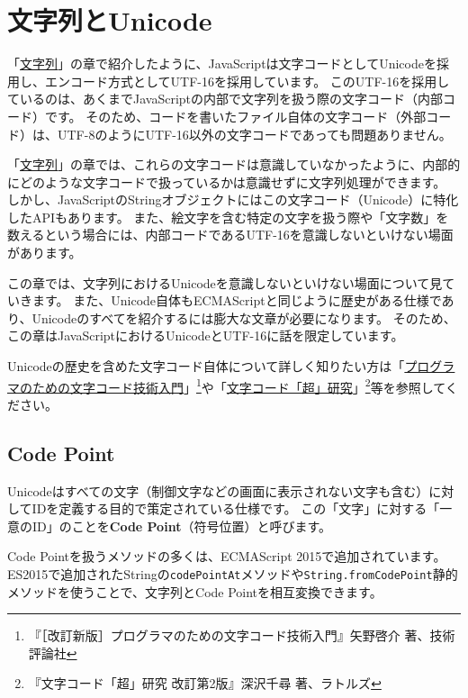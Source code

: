\hypertarget{string-unicode}{%
\chapter{文字列とUnicode}\label{string-unicode}}
\thispagestyle{frontheadings}

「\hyperlink{string}{文字列}」の章で紹介したように、JavaScriptは文字コードとしてUnicodeを採用し、エンコード方式としてUTF-16を採用しています。
このUTF-16を採用しているのは、あくまでJavaScriptの内部で文字列を扱う際の文字コード（内部コード）です。
そのため、コードを書いたファイル自体の文字コード（外部コード）は、UTF-8のようにUTF-16以外の文字コードであっても問題ありません。

「\hyperlink{string}{文字列}」の章では、これらの文字コードは意識していなかったように、内部的にどのような文字コードで扱っているかは意識せずに文字列処理ができます。
しかし、JavaScriptのStringオブジェクトにはこの文字コード（Unicode）に特化したAPIもあります。
また、絵文字を含む特定の文字を扱う際や「文字数」を数えるという場合には、内部コードであるUTF-16を意識しないといけない場面があります。

この章では、文字列におけるUnicodeを意識しないといけない場面について見ていきます。
また、Unicode自体もECMAScriptと同じように歴史がある仕様であり、Unicodeのすべてを紹介するには膨大な文章が必要になります。
そのため、この章はJavaScriptにおけるUnicodeとUTF-16に話を限定しています。

Unicodeの歴史を含めた文字コード自体について詳しく知りたい方は「\href{https://gihyo.jp/book/2019/978-4-297-10291-3}{プログラマのための文字コード技術入門}」\footnote{『［改訂新版］プログラマのための文字コード技術入門』矢野啓介 著、技術評論社}や「\href{https://shop.rutles.net/?pid=173173599}{文字コード「超」研究}」\footnote{『文字コード「超」研究 改訂第2版』深沢千尋 著、ラトルズ}等を参照してください。

\hypertarget{code-point}{%
\section{Code Point}\label{code-point}}

Unicodeはすべての文字（制御文字などの画面に表示されない文字も含む）に対してIDを定義する目的で策定されている仕様です。
この「文字」に対する「一意のID」のことを\textbf{Code
Point}（符号位置）と呼びます。

Code Pointを扱うメソッドの多くは、ECMAScript 2015で追加されています。
ES2015で追加されたStringの\texttt{codePointAt}メソッドや\texttt{String.fromCodePoint}静的メソッドを使うことで、文字列とCode
Pointを相互変換できます。

